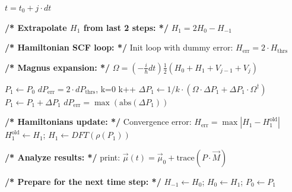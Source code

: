 \documentclass[journal=jctcce,manuscript=article,etalmode=truncate,maxauthors=10,layout=twocolumn,9pt]{achemso}   %
\begin{document}
\begin{algorithm}[h!]
\begin{algorithmic}[1]
\item[] 
\item[{\bf /* Initialization  of TDDFT time  loop: */}] 
    \State $t = t_0 + j \cdot dt$
    \item[] \hspace{5pt}  {\bf /* Extrapolate $H_1$ from last  2 steps: */}
    \State          $H_1 = 2H_0 - H_{-1}$
    \item[] 
    \item[] \hspace{0pt} {\bf /*  Hamiltonian  SCF loop: */}
    \State  Init loop with dummy error: $H_{\text{err}} = 2 \cdot H_{\text{thrs}}$
        \item[] \hspace{15pt}  {\bf /* Magnus expansion: */ }
        \State   $\Omega = (-\tfrac{i}{\hbar} dt )\tfrac{1}{2}(H_0 + H_1 + V_{j-1} + V_{j})$

        \item[]
        \item[] \hspace{15pt}{\bf /*  Commutator expansion: */ }
        \State   $P_1 \gets  P_0$  
        \State  $dP_{\text{err}} = 2 \cdot dP_{\text{thrs}}$,
        \State   k=0 
            \State k++
            \State  $\Delta P_1 \gets  1/k \cdot (\Omega \cdot \Delta P_1 + \Delta P_1 \cdot \Omega^\dag)$
            \State $P_1 \gets  P_1 + \Delta P_1$
            \State $dP_{\text{err}} = \max(\text{abs}(\Delta P_1))$
        \EndWhile
        \item[]
        \item[]\hspace{10pt} {{\bf /*  Hamiltonians update: */  }}
        \State Convergence error: $H_{\text{err}} = \max |H_1 - H_1^{\text{old}}|$
        \State  $H_1^{\text{old}} \gets  H_1$; $H_1  \gets  DFT(\rho(P_1)  )$
    \EndWhile
    \item[]
    \item[] \hspace{0pt} {\bf /*  Analyze results: */}
    \State  print:  $\vec \mu(t) = \vec \mu_0 + \text{trace}(P \cdot \vec M)$
    \item[]
    \item[] \hspace{0pt}  {\bf /* Prepare for the next time step: */ }
    \State   $H_{-1}\gets H_0$; $H_0 \gets  H_1$; $P_0 \gets  P_1$
\EndFor
\end{algorithmic}
\end{algorithm}
\end{document}
